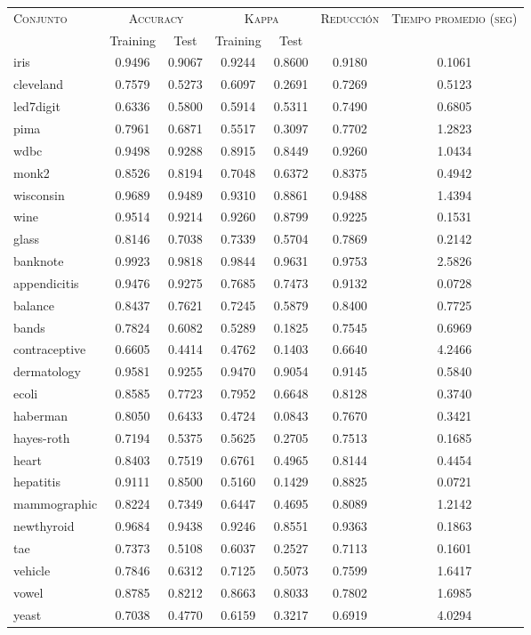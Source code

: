 \begin{table}[]
\centering
\begin{tabular}{l c c c c c c}
\hline
\multirow{2}{*}{\textsc{Conjunto}}
	& \multicolumn{2}{c}{\textsc{Accuracy}}
	& \multicolumn{2}{c}{\textsc{Kappa}}
	& \textsc{Reducción}
	& \textsc{Tiempo promedio (seg)} \\
	& Training & Test
	& Training & Test \\ 
\hline
\hline

iris & 0.9496 & 0.9067 & 0.9244 & 0.8600 & 0.9180 & 0.1061 \\
cleveland & 0.7579 & 0.5273 & 0.6097 & 0.2691 & 0.7269 & 0.5123 \\
led7digit & 0.6336 & 0.5800 & 0.5914 & 0.5311 & 0.7490 & 0.6805 \\
pima & 0.7961 & 0.6871 & 0.5517 & 0.3097 & 0.7702 & 1.2823 \\
wdbc & 0.9498 & 0.9288 & 0.8915 & 0.8449 & 0.9260 & 1.0434 \\
monk2 & 0.8526 & 0.8194 & 0.7048 & 0.6372 & 0.8375 & 0.4942 \\
wisconsin & 0.9689 & 0.9489 & 0.9310 & 0.8861 & 0.9488 & 1.4394 \\
wine & 0.9514 & 0.9214 & 0.9260 & 0.8799 & 0.9225 & 0.1531 \\
glass & 0.8146 & 0.7038 & 0.7339 & 0.5704 & 0.7869 & 0.2142 \\
banknote & 0.9923 & 0.9818 & 0.9844 & 0.9631 & 0.9753 & 2.5826 \\
appendicitis & 0.9476 & 0.9275 & 0.7685 & 0.7473 & 0.9132 & 0.0728 \\
balance & 0.8437 & 0.7621 & 0.7245 & 0.5879 & 0.8400 & 0.7725 \\
bands & 0.7824 & 0.6082 & 0.5289 & 0.1825 & 0.7545 & 0.6969 \\
contraceptive & 0.6605 & 0.4414 & 0.4762 & 0.1403 & 0.6640 & 4.2466 \\
dermatology & 0.9581 & 0.9255 & 0.9470 & 0.9054 & 0.9145 & 0.5840 \\
ecoli & 0.8585 & 0.7723 & 0.7952 & 0.6648 & 0.8128 & 0.3740 \\
haberman & 0.8050 & 0.6433 & 0.4724 & 0.0843 & 0.7670 & 0.3421 \\
hayes-roth & 0.7194 & 0.5375 & 0.5625 & 0.2705 & 0.7513 & 0.1685 \\
heart & 0.8403 & 0.7519 & 0.6761 & 0.4965 & 0.8144 & 0.4454 \\
hepatitis & 0.9111 & 0.8500 & 0.5160 & 0.1429 & 0.8825 & 0.0721 \\
mammographic & 0.8224 & 0.7349 & 0.6447 & 0.4695 & 0.8089 & 1.2142 \\
newthyroid & 0.9684 & 0.9438 & 0.9246 & 0.8551 & 0.9363 & 0.1863 \\
tae & 0.7373 & 0.5108 & 0.6037 & 0.2527 & 0.7113 & 0.1601 \\
vehicle & 0.7846 & 0.6312 & 0.7125 & 0.5073 & 0.7599 & 1.6417 \\
vowel & 0.8785 & 0.8212 & 0.8663 & 0.8033 & 0.7802 & 1.6985 \\
yeast & 0.7038 & 0.4770 & 0.6159 & 0.3217 & 0.6919 & 4.0294 \\


\end{tabular}
\end{table}
